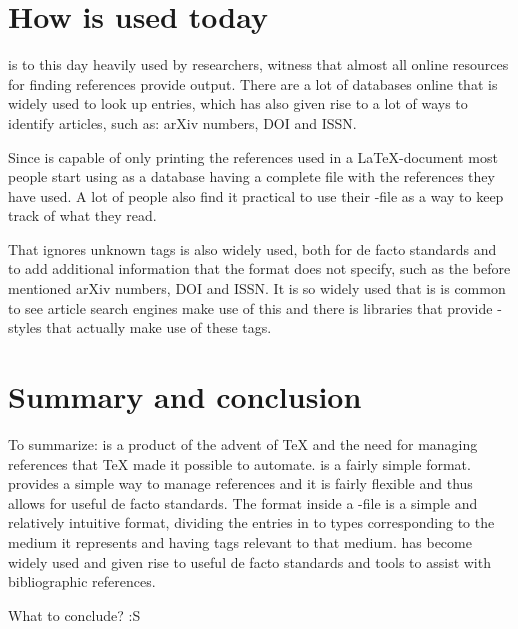 \section{How {\bibtex} is used today}
\label{sec:how_bibtex_is_used_today}

{\bibtex} is to this day heavily used by researchers, witness that
almost all online resources for finding references provide {\bibtex}
output.  There are a lot of databases online that is widely used to
look up entries, which has also given rise to a lot of ways to
identify articles, such as: arXiv numbers, DOI and ISSN.

Since {\bibtex} is capable of only printing the references used in a
{\LaTeX}-document most people start using {\bibtex} as a database
having a complete file with the references they have used.  A lot of
people also find it practical to use their {\bibtex}-file as a way to
keep track of what they read.

That {\bibtex} ignores unknown tags is also widely used, both for de
facto standards and to add additional information that the format does
not specify, such as the before mentioned arXiv numbers, DOI and ISSN.
It is so widely used that is is common to see article search engines
make use of this and there is libraries that provide {\bibtex}-styles
that actually make use of these tags.


\section{Summary and conclusion}

To summarize: {\bibtex} is a product of the advent of {\TeX} and the
need for managing references that {\TeX} made it possible to automate.
{\bibtex} is a fairly simple format.  {\bibtex} provides a simple way
to manage references and it is fairly flexible and thus allows for
useful de facto standards.  The format inside a {\bibtex}-file is a
simple and relatively intuitive format, dividing the entries in to
types corresponding to the medium it represents and having tags
relevant to that medium.  {\bibtex} has become widely used and given
rise to useful de facto standards and tools to assist with
bibliographic references.

What to conclude? :S